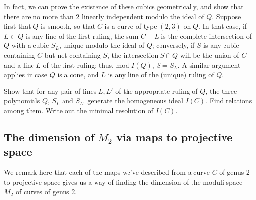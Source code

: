 In fact, we can prove the existence of these cubics geometrically, and show that there are no more than 2 linearly independent modulo the ideal of $Q$. Suppose first that $Q$ is smooth, so that $C$ is a curve of type $(2,3)$ on $Q$. In that case, if $L \subset Q$ is any line of the first ruling, the sum $C+L$ is the complete intersection of $Q$ with a cubic $S_L$, unique modulo the ideal of $Q$; conversely, if $S$ is any cubic containing $C$ but not containing $S$, the intersection $S \cap Q$ will be the union of $C$ and a line $L$ of the first ruling; thus, mod $I(Q)$, $S = S_L$. A similar argument applies in case $Q$ is a cone, and $L$ is any line of the (unique) ruling of $Q$.

\begin{exercise}
Show that for any pair of lines $L, L'$ of the appropriate ruling of $Q$, the three polynomials $Q$, $S_L$ and $S_{L'}$ generate the homogeneous ideal $I(C)$. Find relations among them. Write out the minimal resolution of $I(C)$.
\end{exercise}

%
%
%

\subsection{The dimension of $M_2$ via maps to projective space}

We remark here that each of the maps we've described from a curve $C$ of genus 2 to projective space gives us a way of finding the dimension of the moduli space $M_2$ of curves of genus 2.

